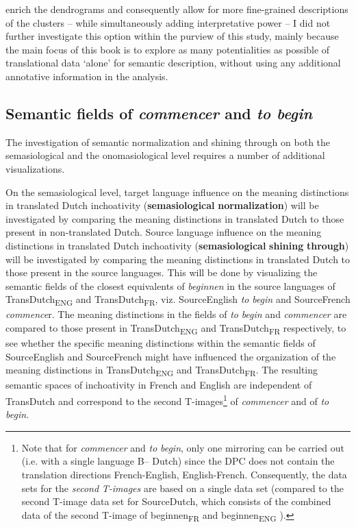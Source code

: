 enrich the dendrograms and consequently allow for more fine-grained descriptions of the clusters – while simultaneously adding interpretative power – I did not further investigate this option within the purview of this study, mainly because the main focus of this book is to explore as many potentialities as possible of translational data ‘alone’ for semantic description, without using any additional annotative information in the analysis.

\subsection{Semantic fields of \textit{commencer} and \textit{to begin}}
\label{sec:3.8.2}  
The investigation of semantic normalization and shining through on both the semasiological and the onomasiological level requires a number of additional visualizations.

On the semasiological level, target language influence on the meaning distinctions in translated Dutch inchoativity (\textbf{semasiological} \textbf{normalization}) will be investigated by comparing the meaning distinctions in translated Dutch to those present in non-translated Dutch. Source language influence on the meaning distinctions in translated Dutch inchoativity (\textbf{semasiological} \textbf{shining} \textbf{through}) will be investigated by comparing the meaning distinctions in translated Dutch to those present in the source languages. This will be done by visualizing the semantic fields of the closest equivalents of \textit{beginnen} in the source languages of TransDutch\textsubscript{ENG} and TransDutch\textsubscript{FR}, viz. SourceEnglish \textit{to} \textit{begin} and SourceFrench \textit{commence}r. The meaning distinctions in the fields of \textit{to} \textit{begin} and \textit{commencer} are compared to those present in TransDutch\textsubscript{ENG} and TransDutch\textsubscript{FR} respectively, to see whether the specific meaning distinctions within the semantic fields of SourceEnglish and SourceFrench might have influenced the organization of the meaning distinctions in TransDutch\textsubscript{ENG} and TransDutch\textsubscript{FR}. The resulting semantic spaces of inchoativity in French and English are independent of TransDutch and correspond to the second T-images\footnote{Note that for \textit{commencer} and \textit{to} \textit{begin}, only one mirroring can be carried out (i.e. with a single language B– Dutch) since the DPC does not contain the translation directions French-English, English-French. Consequently, the data sets for the \textit{second} \textit{T-images} are based on a single data set (compared to the second T-image data set for SourceDutch, which consists of the combined data of the second T-image of beginnen\textsubscript{FR} and beginnen\textsubscript{ENG} ).} of \textit{commencer} and of \textit{to} \textit{begin.}

